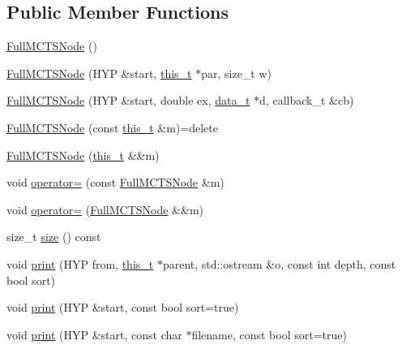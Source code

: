 \subsection*{Public Member Functions}
\begin{DoxyCompactItemize}
\item 
\hyperlink{class_full_m_c_t_s_node_ae91b538d6d07a8e0ea50892c48df36ec}{Full\+M\+C\+T\+S\+Node} ()
\item 
\hyperlink{class_full_m_c_t_s_node_aa9f88c850101f42662b9f880c06cbe9a}{Full\+M\+C\+T\+S\+Node} (H\+YP \&start, \hyperlink{class_full_m_c_t_s_node_afcc6a60f2d45fd1d6c4bd5f4998b147d}{this\+\_\+t} $\ast$par, size\+\_\+t w)
\item 
\hyperlink{class_full_m_c_t_s_node_a1962475abb800ec3214468ea5331e080}{Full\+M\+C\+T\+S\+Node} (H\+YP \&start, double ex, \hyperlink{class_full_m_c_t_s_node_a9c9c98180d9c5a799f118a79976536a6}{data\+\_\+t} $\ast$d, callback\+\_\+t \&cb)
\item 
\hyperlink{class_full_m_c_t_s_node_a14947275f094e11f1ae2f709303ff8a8}{Full\+M\+C\+T\+S\+Node} (const \hyperlink{class_full_m_c_t_s_node_afcc6a60f2d45fd1d6c4bd5f4998b147d}{this\+\_\+t} \&m)=delete
\item 
\hyperlink{class_full_m_c_t_s_node_a1f86e401ffbc24dcbd1ac6913bec460f}{Full\+M\+C\+T\+S\+Node} (\hyperlink{class_full_m_c_t_s_node_afcc6a60f2d45fd1d6c4bd5f4998b147d}{this\+\_\+t} \&\&m)
\item 
void \hyperlink{class_full_m_c_t_s_node_acdc8983748288ba75aa250db8ef72ebc}{operator=} (const \hyperlink{class_full_m_c_t_s_node}{Full\+M\+C\+T\+S\+Node} \&m)
\item 
void \hyperlink{class_full_m_c_t_s_node_a43c0d237d68bd504fb000524a42fad89}{operator=} (\hyperlink{class_full_m_c_t_s_node}{Full\+M\+C\+T\+S\+Node} \&\&m)
\item 
size\+\_\+t \hyperlink{class_full_m_c_t_s_node_a57b4b69d2c9dd20ae5bfdee83aec783a}{size} () const
\item 
void \hyperlink{class_full_m_c_t_s_node_ab12c625acd3e18a9f50b4491442f9a14}{print} (H\+YP from, \hyperlink{class_full_m_c_t_s_node_afcc6a60f2d45fd1d6c4bd5f4998b147d}{this\+\_\+t} $\ast$parent, std\+::ostream \&o, const int depth, const bool sort)
\item 
void \hyperlink{class_full_m_c_t_s_node_a5e19a1daa58f5dd9bf0fee41527c1f0e}{print} (H\+YP \&start, const bool sort=true)
\item 
void \hyperlink{class_full_m_c_t_s_node_afed4f436edc8b28876c1afc3f715d7f1}{print} (H\+YP \&start, const char $\ast$filename, const bool sort=true)

\end{DoxyCompactItemize}
